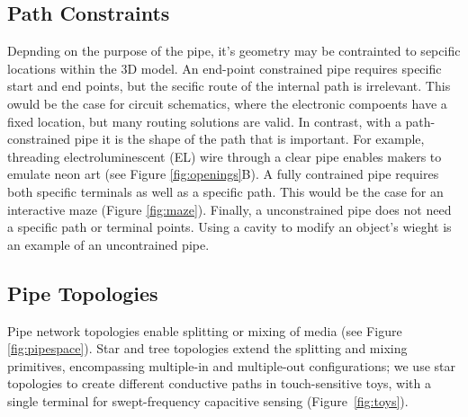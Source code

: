 \subsection{Path Constraints}
Depnding on the purpose of the pipe, it's  geometry may be contrainted to sepcific locations within the 3D model. An end-point constrained pipe requires specific start and end points, but the secific route of the internal path is irrelevant. This owuld be the case for circuit schematics, where the electronic compoents have a fixed location, but many routing solutions are valid. In contrast, with a path-constrained pipe it is the shape of the path that is important. For example, threading electroluminescent (EL) wire through a clear pipe enables makers to emulate neon art (see Figure \ref{fig:openings}B). A fully contrained pipe requires both specific terminals as well as a specific path. This would be the case for an interactive  maze (Figure \ref{fig:maze}). Finally, a unconstrained pipe does not need a specific path or terminal points. Using a cavity to modify an object's wieght is an example of an uncontrained pipe.

\subsection{Pipe Topologies}
Pipe network topologies enable splitting or mixing of media (see Figure \ref{fig:pipespace}).  Star and tree topologies extend the splitting and mixing primitives, encompassing multiple-in and multiple-out configurations; we use star topologies to create different conductive paths in touch-sensitive toys, with a single terminal for swept-frequency capacitive sensing (Figure~\ref{fig:toys}).

